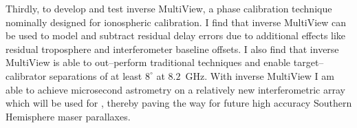 {{		Thirdly, to develop and test inverse MultiView, a phase calibration technique nominally designed for ionospheric calibration. 
		I find that inverse MultiView can be used to model and subtract residual delay errors due to additional effects like residual troposphere and interferometer baseline offsets. I also find that inverse MultiView is able to out--perform traditional techniques and enable target--calibrator separations of at least $8^\circ$ at $8.2$~GHz. With inverse MultiView I am able to achieve microsecond astrometry on a relatively new interferometric array which will be used for \spirals, thereby paving the way for future high accuracy Southern Hemisphere maser parallaxes.
		}}

\newcommand{\acknowledgement}
{ {	 Firstly I would like to thank my supervisor Simon. You have always supported me in your role, helped me out and been patient with me.
		
	 I would like to also thank Mark Reid for being a great mentor and teacher. Almost everything I know about this topic comes from you either directly in--person or indirectly through your work.
	 
	 My parents, Melissa and Glenn have always been extremely supportive and kind to me, the last 
	 
	 Thank you my incredible partner June. 
	 
	 My good friend Jonny 
	 
	 My colleagues and friends, Patrick, Josh, Tiege, Andrew, Katie, Gabor, Jayender, Ben, Seb and Magai.
	
	 
	
	} }


\beforepreface
\afterpreface
